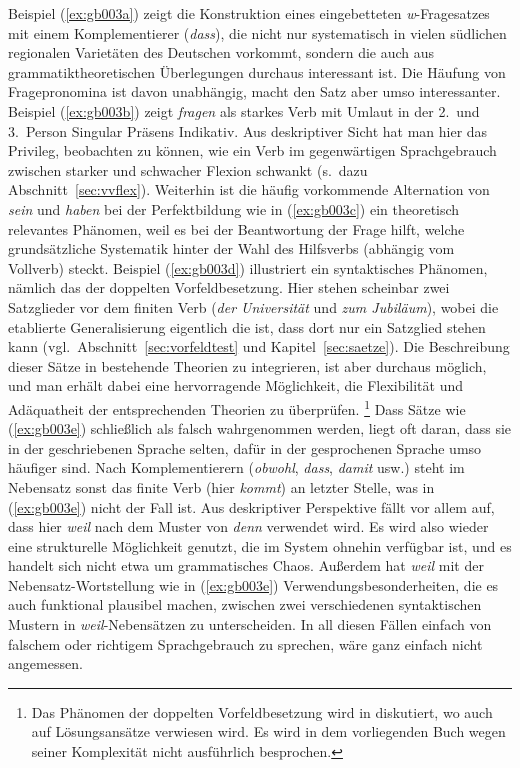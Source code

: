Beispiel (\ref{ex:gb003a}) zeigt die Konstruktion eines eingebetteten \textit{w}-Fragesatzes mit einem Komplementierer (\textit{dass}), die nicht nur systematisch in vielen südlichen regionalen Varietäten des Deutschen vorkommt, sondern die auch aus grammatiktheoretischen Überlegungen durchaus interessant ist.
Die Häufung von Fragepronomina ist davon unabhängig, macht den Satz aber umso interessanter.
Beispiel (\ref{ex:gb003b}) zeigt \textit{fragen} als starkes Verb mit Umlaut in der 2.\ und 3.\ Person Singular Präsens Indikativ.
Aus deskriptiver Sicht hat man hier das Privileg, beobachten zu können, wie ein Verb im gegenwärtigen Sprachgebrauch zwischen starker und schwacher Flexion schwankt (s.\ dazu Abschnitt~\ref{sec:vvflex}).
Weiterhin ist die häufig vorkommende Alternation von \textit{sein} und \textit{haben} bei der Perfektbildung wie in (\ref{ex:gb003c}) ein theoretisch relevantes Phänomen, weil es bei der Beantwortung der Frage hilft, welche grundsätzliche Systematik hinter der Wahl des Hilfsverbs (abhängig vom Vollverb) steckt.
Beispiel (\ref{ex:gb003d}) illustriert ein syntaktisches Phänomen, nämlich das der doppelten Vorfeldbesetzung.
Hier stehen scheinbar zwei Satzglieder vor dem finiten Verb (\textit{der Universität} und \textit{zum Jubiläum}), wobei die etablierte Generalisierung eigentlich die ist, dass dort nur ein Satzglied stehen kann (vgl.\ Abschnitt~\ref{sec:vorfeldtest} und Kapitel~\ref{sec:saetze}).
Die Beschreibung dieser Sätze in bestehende Theorien zu integrieren, ist aber durchaus möglich, und man erhält dabei eine hervorragende Möglichkeit, die Flexibilität und Adäquatheit der entsprechenden Theorien zu überprüfen.%
\footnote{Das Phänomen der doppelten Vorfeldbesetzung wird in \citet{Mueller03} diskutiert, wo auch auf Lösungsansätze verwiesen wird.
Es wird in dem vorliegenden Buch wegen seiner Komplexität nicht ausführlich besprochen.}
Dass Sätze wie (\ref{ex:gb003e}) schließlich als falsch wahrgenommen werden, liegt oft daran, dass sie in der geschriebenen Sprache selten, dafür in der gesprochenen Sprache umso häufiger sind.
Nach Komplementierern (\textit{obwohl}, \textit{dass}, \textit{damit} usw.) steht im Nebensatz sonst das finite Verb (hier \textit{kommt}) an letzter Stelle, was in (\ref{ex:gb003e}) nicht der Fall ist.
Aus deskriptiver Perspektive fällt vor allem auf, dass hier \textit{weil} nach dem Muster von \textit{denn} verwendet wird.
Es wird also wieder eine strukturelle Möglichkeit genutzt, die im System ohnehin verfügbar ist, und es handelt sich nicht etwa um grammatisches Chaos.
Außerdem hat \textit{weil} mit der Nebensatz-Wortstellung wie in (\ref{ex:gb003e}) Verwendungsbesonderheiten, die es auch funktional plausibel machen, zwischen zwei verschiedenen syntaktischen Mustern in \textit{weil}-Nebensätzen zu unterscheiden.
In all diesen Fällen einfach von falschem oder richtigem Sprachgebrauch zu sprechen, wäre ganz einfach nicht angemessen.

